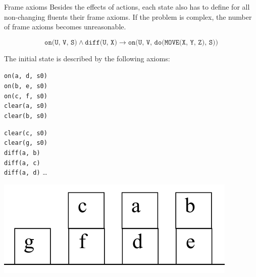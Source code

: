 \begin{descriptionlist}
    \item[Frame axioms]
        Besides the effects of actions, each state also has to define for all non-changing fluents their frame axioms.
        If the problem is complex, the number of frame axioms becomes unreasonable.
        \begin{example}
            \[ \texttt{on(U, V, S)} \land \texttt{diff(U, X)} \rightarrow \texttt{on(U, V, do(MOVE(X, Y, Z), S))} \]
        \end{example}
\end{descriptionlist}


\begin{example}
    The initial state is described by the following axioms:\\[0.5em]
    \begin{minipage}{.3\linewidth}
        \centering
        \texttt{on(a, d, s0)} \\
        \texttt{on(b, e, s0)} \\
        \texttt{on(c, f, s0)} \\
        \texttt{clear(a, s0)} \\
        \texttt{clear(b, s0)} \\
    \end{minipage}
    \begin{minipage}{.3\linewidth}
        \centering
        \texttt{clear(c, s0)} \\
        \texttt{clear(g, s0)} \\
        \texttt{diff(a, b)} \\
        \texttt{diff(a, c)} \\
        \texttt{diff(a, d)} \dots \\
    \end{minipage}
    \begin{minipage}{.3\linewidth}
        \centering
        \includegraphics[width=\linewidth]{img/_moving_block_example_green.pdf}
    \end{minipage}\\[0.5em]


\end{example}
